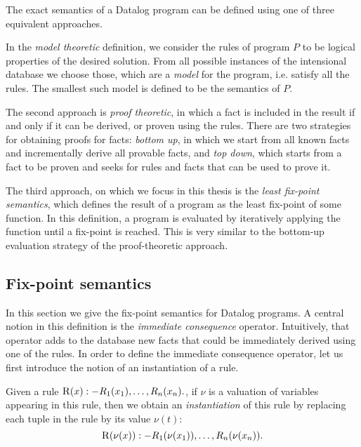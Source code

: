 
 The exact semantics of a Datalog program can be defined using one of three  equivalent approaches.

In the \emph{model theoretic} definition, we consider the rules of program $P$ to be logical properties of the desired solution. From all possible instances of the intensional database we choose those, which are a \emph{model} for the program, i.e. satisfy all the rules. The smallest such model is defined to be the semantics of $P$.

The second approach is \emph{proof theoretic}, in which a fact is included in the result if and only if it can be derived, or proven using the rules. There are two strategies for obtaining proofs for facts: \emph{bottom up}, in which we start from all known facts and incrementally derive all provable facts, and \emph{top down}, which starts from a fact to be proven and seeks for rules and facts that can be used to prove it.

The third approach, on which we focus in this thesis is the \emph{least fix-point semantics}, which defines the result of a program as the least fix-point of some function. In this definition, a program is evaluated by iteratively applying the function until a fix-point is reached. This is very similar to the bottom-up evaluation strategy of the proof-theoretic approach.

\subsection{Fix-point semantics}
In this section we give the fix-point semantics for Datalog programs. A central notion in this definition is the \emph{immediate consequence} operator. Intuitively, that operator adds to the database new facts that could be immediately derived using one of the rules. In order to define the immediate consequence operator, let us first introduce the notion of an instantiation of a rule.

\begin{defn}[Instantiation]
Given a rule $ \textsc{R}(x) :- R_1(x_1), \dots, R_n(x_n). $, if $\nu$ is a valuation of variables appearing in this rule, then we obtain an \emph{instantiation} of this rule by replacing each tuple in the rule by its value $\nu(t)$:
$$ \textsc{R}(\nu(x)) :- R_1(\nu(x_1)), \dots, R_n(\nu(x_n)). $$
\end{defn}

